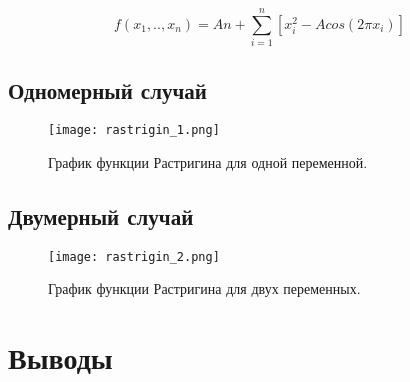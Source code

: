 \begin{equation}
\label{rastrigin_eq}
f(x_1, .., x_n) = An + \sum\limits_{i = 1}^n\left[ x_i^2 - Acos\left(2 \pi x_i \right)\right]
\end{equation}

\subsection{Одномерный случай}

\begin{figure}
    \centering
    \texttt{[image: rastrigin\_1.png]}
    \caption{График функции Растригина для одной переменной.}
    \label{rastrigin_plot}
\end{figure}

\subsection{Двумерный случай}

\begin{figure}
    \centering
    \texttt{[image: rastrigin\_2.png]}
    \caption{График функции Растригина для двух переменных.}
    \label{rastrigin_plot}
\end{figure}

\section{Выводы}
